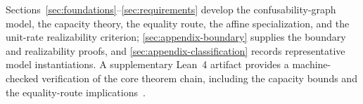 \medskip
Sections~\ref{sec:foundations}--\ref{sec:requirements} develop the confusability-graph model, the capacity theory, the equality route, the affine specialization, and the unit-rate realizability criterion; \ref{sec:appendix-boundary} supplies the boundary and realizability proofs, and \ref{sec:appendix-classification} records representative model instantiations. A supplementary Lean~4 artifact provides a machine-checked verification of the core theorem chain, including the capacity bounds and the equality-route implications~\cite{demoura2021lean4,mathlib2020}.


